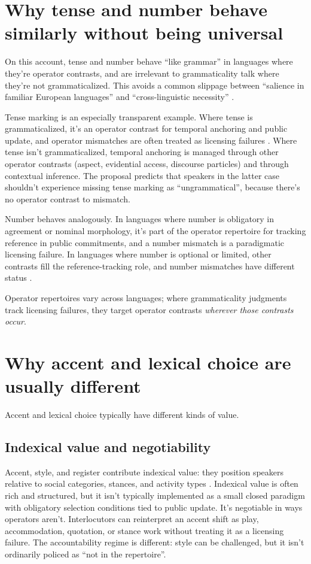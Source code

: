 \documentclass[12pt,letterpaper]{article}
\begin{document}
\section{Why tense and number behave similarly without being universal}

On this account, tense and number behave \enquote{like grammar} in languages where they're operator contrasts, and are irrelevant to grammaticality talk where they're not grammaticalized. This avoids a common slippage between \enquote{salience in familiar European languages} and \enquote{cross-linguistic necessity} \citep{haspelmath2007}.

Tense marking is an especially transparent example. Where tense is grammaticalized, it's an operator contrast for temporal anchoring and public update, and operator mismatches are often treated as licensing failures \citep{comrie1985}. Where tense isn't grammaticalized, temporal anchoring is managed through other operator contrasts (aspect, evidential access, discourse particles) and through contextual inference. The proposal predicts that speakers in the latter case shouldn't experience missing tense marking as \enquote{ungrammatical}, because there's no operator contrast to mismatch.

Number behaves analogously. In languages where number is obligatory in agreement or nominal morphology, it's part of the operator repertoire for tracking reference in public commitments, and a number mismatch is a paradigmatic licensing failure. In languages where number is optional or limited, other contrasts fill the reference-tracking role, and number mismatches have different status \citep{corbett2000}.

Operator repertoires vary across languages; where grammaticality judgments track licensing failures, they target operator contrasts \emph{wherever those contrasts occur}.

\section{Why accent and lexical choice are usually different}

Accent and lexical choice typically have different kinds of value.

\subsection{Indexical value and negotiability}

Accent, style, and register contribute indexical value: they position speakers relative to social categories, stances, and activity types \citep{silverstein1976,eckert2008,agha2007,coupland2007}. Indexical value is often rich and structured, but it isn't typically implemented as a small closed paradigm with obligatory selection conditions tied to public update. It's negotiable in ways operators aren't. Interlocutors can reinterpret an accent shift as play, accommodation, quotation, or stance work without treating it as a licensing failure. The accountability regime is different: style can be challenged, but it isn't ordinarily policed as \enquote{not in the repertoire}.
\end{document}
